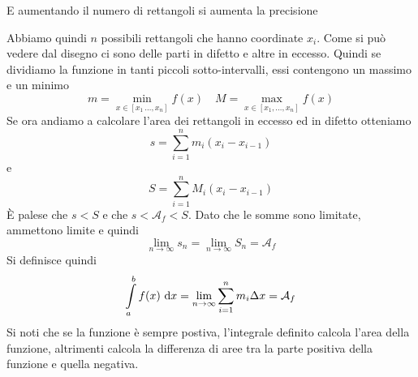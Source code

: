 E aumentando il numero di rettangoli si aumenta la precisione
\begin{center}
\end{center}
Abbiamo quindi $n$ possibili rettangoli che hanno coordinate $x_i$. Come si può vedere dal disegno
ci sono delle parti in difetto e altre in eccesso. Quindi se dividiamo la funzione in tanti piccoli
sotto-intervalli, essi contengono un massimo e un minimo
\begin{equation*}
  m = \min_{x\in[x_1\,\ldots,x_n]}f(x)\quad M = \max_{x\in[x_1,\ldots,x_n]}f(x)
\end{equation*}
Se ora andiamo a calcolare l'area dei rettangoli in eccesso ed in difetto otteniamo
\begin{equation*}
  s = \sum\limits^{n}_{i=1} m_i(x_i-x_{i-1}) 
\end{equation*}
e
\begin{equation*}
  S =\sum\limits^{n}_{i=1} M_i(x_i-x_{i-1})
\end{equation*}
È palese che $s<S$ e che $s < \mathcal{A}_f < S$. Dato che le somme sono limitate, ammettono limite
e quindi
\begin{equation*}
  \lim\limits_{n \to \infty} s_n = \lim\limits_{n \to \infty} S_n = \mathcal{A}_f
\end{equation*}
Si definisce quindi
\begin{equation*}
  \int\limits_a^b f(x)\,\mathop{}\!\mathrm{d} x=\lim\limits_{n\to\infty}\sum\limits^{n}_{i=1}m_i\Delta x=
  \mathcal{A}_f
\end{equation*}
Si noti che se la funzione è sempre postiva, l'integrale definito calcola l'area della funzione,
altrimenti calcola la differenza di aree tra la parte positiva della funzione e quella negativa.

